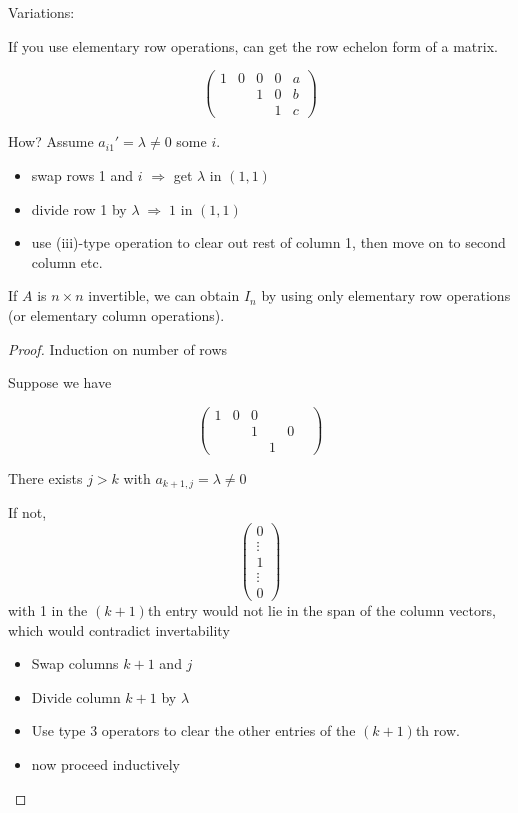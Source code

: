 \documentclass[a4paper]{article}
\begin{document}
Variations:

If you use elementary row operations, can get the row echelon form of a matrix. 

\[ \begin{pmatrix}
1 & 0 & 0 & 0 & a \\
& & 1 & 0 & b\\
& & & 1 & c  
\end{pmatrix} \]

How? Assume $ a_{i1}' = \lambda \neq 0 $ some $ i $.
\begin{itemize}
	\item swap rows 1 and $ i $ $ \Rightarrow $ get $ \lambda $ in $ (1,1) $
	\item divide row 1 by $ \lambda \; \Rightarrow \; 1 $ in $ (1,1) $
	\item use (iii)-type operation to clear out rest of column 1, then move on to second column etc.  
\end{itemize}

\begin{lemma} 
	If $ A $ is $ n \times n $ invertible, we can obtain $ I_{n} $ by using only elementary row operations (or elementary column operations).
\end{lemma}

\begin{proof}
	Induction on number of rows
	
	
	Suppose we have
	
	\[ \begin{pmatrix}
	1 & 0 & 0 & & &  \\
	& & 1 & & 0 & \\
	& & & 1 & & 
	\end{pmatrix} \]
	
	There exists $ j > k $ with $ a_{k+1,j} = \lambda \neq 0 $
	
	If not, 	\[ \begin{pmatrix}
	0 \\
	\vdots \\
	1 \\
	\vdots \\
	0
	\end{pmatrix} \] with 1 in the $ (k+1) $th entry would not lie in the span of the column vectors, which would contradict invertability
	
	
	\begin{itemize}
		\item Swap columns $ k+1 $ and $ j $
		\item Divide column $ k+1 $ by $ \lambda $
		\item Use type 3 operators to clear the other entries of the $ (k+1) $th row. 
		\item now proceed inductively
	\end{itemize}
	
	
	
\end{proof}
\end{document}
